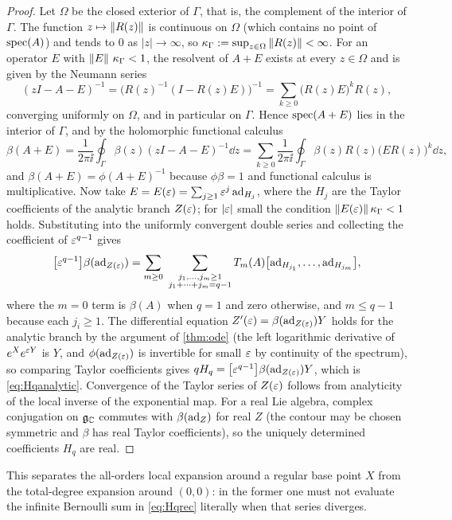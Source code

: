 \begin{proof}
Let $\Omega$ be the closed exterior of $\Gamma$, that is, the complement of
the interior of $\Gamma$. The function $z\mapsto\left\lVert R(z)\right\rVert$ is continuous
on $\Omega$ (which contains no point of $\operatorname{spec}(A)$) and tends to $0$ as
$|z|\to\infty$, so $\kappa_\Gamma:=\sup_{z\in\Omega}\left\lVert R(z)\right\rVert<\infty$. For
an operator $E$ with $\left\lVert E\right\rVert\,\kappa_\Gamma<1$, the resolvent of $A+E$
exists at every $z\in\Omega$ and is given by the Neumann series
\[
 (zI-A-E)^{-1}=\bigl(R(z)^{-1}(I-R(z)E)\bigr)^{-1}
 =\sum_{k\geq0}\bigl(R(z)E\bigr)^kR(z),
\]
converging uniformly on $\Omega$, and in particular on $\Gamma$. Hence
$\operatorname{spec}(A+E)$ lies in the interior of $\Gamma$, and by the holomorphic
functional calculus
\[
 \beta(A+E)=\frac1{2\pi\ii}\oint_\Gamma\beta(z)(zI-A-E)^{-1}\dd z
 =\sum_{k\geq0}\frac1{2\pi\ii}\oint_\Gamma\beta(z)R(z)\bigl(ER(z)\bigr)^k\dd z,
\]
and $\beta(A+E)=\phi(A+E)^{-1}$ because $\phi\beta=1$ and functional
calculus is multiplicative. Now take $E=E(\varepsilon)=\sum_{j\geq1}\varepsilon^j\operatorname{ad}_{H_j}$,
where the $H_j$ are the Taylor coefficients of the analytic branch
$Z(\varepsilon)$; for $|\varepsilon|$ small the condition $\left\lVert E(\varepsilon)\right\rVert\kappa_\Gamma<1$
holds. Substituting into
the uniformly convergent double series and collecting the coefficient of
$\varepsilon^{q-1}$ gives
\[
 \coeff{\eps^{q-1}}\beta(\ad_{Z(\eps)})
 =\sum_{m\geq0}\ \sum_{\substack{j_1,\ldots,j_m\geq1\\j_1+\cdots+j_m=q-1}}
 T_m(A)\bigl[\ad_{H_{j_1}},\ldots,\ad_{H_{j_m}}\bigr],
\]
where the $m=0$ term is $\beta(A)$ when $q=1$ and zero otherwise, and
$m\leq q-1$ because each $j_i\geq1$. The differential equation
$Z'(\varepsilon)=\beta(\operatorname{ad}_{Z(\varepsilon)})Y$ holds for the analytic branch by the
argument of \cref{thm:ode} (the left logarithmic derivative of
$e^Xe^{\varepsilon Y}$ is $Y$, and $\phi(\operatorname{ad}_{Z(\varepsilon)})$ is invertible for small
$\varepsilon$ by continuity of the spectrum), so comparing Taylor coefficients
gives $qH_q=\bigl[\varepsilon^{q-1}\bigr]\beta(\operatorname{ad}_{Z(\varepsilon)})Y$, which is
\eqref{eq:Hqanalytic}. Convergence of the Taylor series of $Z(\varepsilon)$
follows from analyticity of the local inverse of the exponential map. For a
real Lie algebra, complex conjugation on $\mathfrak{g}_{\mathbb{C}}$ commutes with $\beta(\operatorname{ad}_Z)$
for real $Z$ (the contour may be chosen symmetric and $\beta$ has real
Taylor coefficients), so the uniquely determined coefficients $H_q$ are
real.
\end{proof}
This separates the all-orders local expansion around a regular base point
$X$ from the total-degree expansion around $(0,0)$: in the former one must
not evaluate the infinite Bernoulli sum in \eqref{eq:Hqrec} literally when
that series diverges.

